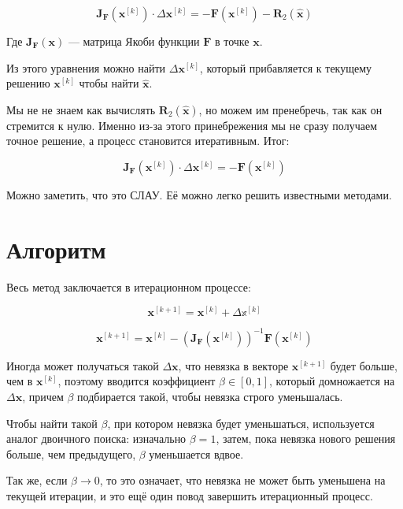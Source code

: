 \documentclass[12pt, a4paper]{article}
\newcommand{\roubr}[1]{\left(#1\right)}
\newcommand{\sqbr}[1]{\left[#1\right]}
\begin{document}
$$
\mathbf{J}_\mathbf{F}\roubr{\mathbf{x}^{[k]}} \cdot \Delta \mathbf{x}^{[k]} = -\mathbf{F}\roubr{\mathbf{x}^{[k]}} - \mathbf{R}_2\roubr{\hat{\mathbf{x}}}
$$

Где $\mathbf{J}_\mathbf{F}\roubr{\mathbf{x}}$ --- матрица Якоби функции $\mathbf{F}$ в точке $\mathbf{x}$.

Из этого уравнения можно найти $\Delta\mathbf{x}^{[k]}$, который прибавляется к текущему решению $\mathbf{x}^{[k]}$ чтобы найти $\hat{\mathbf{x}}$. 

Мы не не знаем как вычислять $\mathbf{R}_2\roubr{\hat{\mathbf{x}}}$, но можем им пренебречь, так как он стремится к нулю. Именно из-за этого принебрежения мы не сразу получаем точное решение, а процесс становится итеративным. Итог:

\begin{equation}\label{slau}
\mathbf{J}_\mathbf{F}\roubr{\mathbf{x}^{[k]}} \cdot \Delta \mathbf{x}^{[k]} = -\mathbf{F}\roubr{\mathbf{x}^{[k]}}
\end{equation}

Можно заметить, что это СЛАУ. Её можно легко решить известными методами.

\section{Алгоритм}

Весь метод заключается в итерационном процессе:

$$
\mathbf{x}^{[k+1]} = \mathbf{x}^{[k]} + \Delta \mathbb{x}^{[k]}
$$

\begin{equation}\label{iter}
\mathbf{x}^{[k+1]} = \mathbf{x}^{[k]} - \roubr{\mathbf{J}_\mathbf{F}\roubr{\mathbf{x}^{[k]}}}^{-1} \mathbf{F}\roubr{\mathbf{x}^{[k]}}
\end{equation}

Иногда может получаться такой $\Delta \mathbf{x}$, что невязка в векторе $\mathbf{x}^{[k+1]}$ будет больше, чем в $\mathbf{x}^{[k]}$, поэтому вводится коэффициент $\beta \in \sqbr{0, 1}$, который домножается на $\Delta \mathbf{x}$, причем $\beta$ подбирается такой, чтобы невязка строго уменьшалась.

Чтобы найти такой $\beta$, при котором невязка будет уменьшаться, используется аналог двоичного поиска: изначально $\beta = 1$, затем, пока невязка нового решения больше, чем предыдущего, $\beta$ уменьшается вдвое. 

Так же, если $\beta \to 0$, то это означает, что невязка не может быть уменьшена на текущей итерации, и это ещё один повод завершить итерационный процесс.
\end{document}
